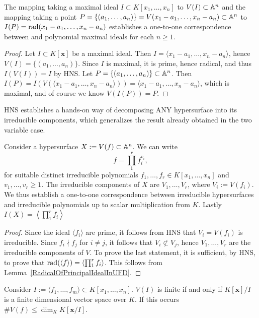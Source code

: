 \begin{corollary}
    The mapping taking a maximal ideal $I\subset K[x_1,\dots,x_n]$ to $V(I)\subset \mathbb{A}^n$ and the mapping taking a point $P=\{(a_1,\dots,a_n)\}=V(x_1-a_1,\dots,x_n-a_n)\subset \mathbb{A}^n$ to $I(P)=\mathrm{rad}(x_1-a_1,\dots,x_n-a_n)$ establishes a one-to-one correspondence between and polynomial maximal ideals for each $n\geq 1$.
\end{corollary}
\begin{proof}
    Let $I\subset K[\mathbf{x}]$ be a maximal ideal. Then $I=\langle x_1-a_1,\dots,x_n-a_n\rangle$, hence $V(I)=\{(a_1,\dots,a_n)\}$. Since $I$ is maximal, it is prime, hence radical, and thus $I(V(I))=I$ by HNS. Let $P = \{(a_1,\dots,a_n)\}\subset \mathbb{A}^n$. Then $I(P)=I(V(\langle x_1-a_1,\dots,x_n-a_n\rangle))= \langle x_1-a_1,\dots,x_n-a_n\rangle$, which is maximal, and of course we know $V(I(P))=P$.   
\end{proof}
HNS establishes a hands-on way of decomposing ANY hypersurface into its irreducible components, which generalizes the result already obtained in the two variable case. 
\begin{corollary}
    Consider a hypersurface $X:=V(f)\subset \mathbb{A}^n$. We can write 
    $$f = \prod_1^r f_i^{v_i},$$
    for suitable distinct irreducible polynomials $f_1,\dots,f_r\in K[x_1,\dots,x_n]$ and $v_1,\dots,v_r\geq 1$. The irreducible components of $X$ are $V_1,\dots,V_r$, where $V_i:= V(f_i)$. We thus establish a one-to-one correspondence between irreducible hypersurfaces and irreducible polynomials up to scalar multiplication from $K$. Lastly $I(X)=\left\langle\prod_1^r f_i \right\rangle$ 
\end{corollary}
\begin{proof}
    Since the ideal $\langle f_i\rangle$ are prime, it follows from HNS that $V_i=V(f_i)$ is irreducible. Since $f_i\nmid f_j$ for $i\neq j$, it follows that $V_i\not\subset V_j$, hence $V_1,\dots,V_r$ are the irreducible components of $V$. To prove the last statement, it is sufficient, by HNS, to prove that $\mathrm{rad}(\langle f\rangle)=\left\langle\prod_1^r f_i \right\rangle$. This follows from Lemma~\ref{RadicalOfPrincipalIdealInUFD}.
\end{proof}
\begin{corollary}\label{DimensionOfCoordinateRing}
    Consider $I:=\langle f_1,\dots,f_m\rangle\subset K[x_1,\dots,x_n]$. $V(I)$ is finite if and only if $K[\mathbf{x}]/I$ is a finite dimensional vector space over $K$. If this occurs $\#V(f)\leq \dim_K K[\mathbf{x}/I]$.
\end{corollary}
